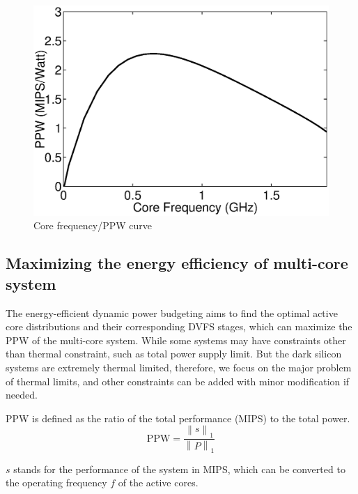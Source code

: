 \begin{figure}
\centering
\includegraphics[width=0.8\linewidth]{fig/f_ppw.eps}
\caption{Core frequency/PPW curve}
\label{fig:f_ppw}
\end{figure}

\subsection{Maximizing the energy efficiency of multi-core system}
The energy-efficient dynamic power budgeting aims to find the optimal active core distributions and their corresponding DVFS stages, which can maximize the PPW of the multi-core system. While some systems may have constraints other than thermal constraint, such as total power supply limit. But the dark silicon systems are extremely thermal limited, therefore, we focus on the major problem of thermal limits, and other constraints can be added with minor modification if needed.

PPW is defined as the ratio of the total performance (MIPS) to the total power.
\begin{equation}\label{eq:ppw}
\text{PPW} = \frac{\left \| s \right \|_{1}}{\left \| P \right \|_{1}}
\end{equation}

$s$ stands for the performance of the system in MIPS, which can be converted to the operating frequency $f$ of the active cores.

